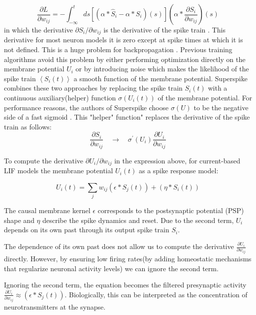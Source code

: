 \documentclass[12pt]{report}
\begin{document}
\begin{equation}
\frac{\partial L}{\partial w_{i j}}=-\int_{-\infty}^{t} d s\left[\left(\alpha * \hat{S}_{i}-\alpha * S_{i}\right)(s)\right]\left(\alpha * \frac{\partial S_{i}}{\partial w_{i j}}\right)(s)
\end{equation}
in which the derivative $\partial S_{i} / \partial w_{i j}$ is the derivative of the spike train . This derivative for most neuron models it is zero except at spike times at which it is not defined. This is a huge problem for backpropagation . Previous training algorithms avoid this problem by either performing optimization directly on the membrane potential $U_{i}$ or by introducing noise which makes the likelihood of the spike train $\left\langle S_{i}(t)\right\rangle$ a smooth function of the membrane potential. Superspike combines these two approaches by replacing the spike train $S_{i}(t)$ with a continuous auxiliary(helper) function $\sigma\left(U_{i}(t)\right)$ of the membrane potential. For performance reasons, the authors of Superspike choose $\sigma(U)$ to be the negative side of a fast sigmoid . This "helper" function" replaces the derivative of the spike train as follows:
\begin{equation}
\frac{\partial S_{i}}{\partial w_{i j}} \quad \rightarrow \quad \sigma^{\prime}\left(U_{i}\right) \frac{\partial U_{i}}{\partial w_{i j}}
\end{equation}

To compute the derivative $\partial U_{i} / \partial w_{i j}$ in the expression above, for current-based LIF models the membrane potential $U_{i}(t)$ as a spike response model:

\begin{equation}
U_{i}(t)=\sum_{j} w_{i j}\left(\epsilon * S_{j}(t)\right)+\left(\eta * S_{i}(t)\right)
\end{equation}

The causal membrane kernel $\epsilon$ corresponds to the postsynaptic potential (PSP) shape and $\eta$ describe the spike dynamics and reset. Due to the second term, $U_{i}$ depends on its own past through its output spike train $S_{i}$. 


The dependence of its own past does not allow us to compute the derivative $\frac{{\partial U}_{i}}{\partial w_{i j}}$ directly. However, by ensuring low firing rates(by adding homeostatic mechanisms that regularize neuronal activity levels) we can ignore the second term.

Ignoring the second term, the equation becomes the filtered presynaptic activity $\frac{\partial U_{i}}{\partial w_{i j}} \approx\left(\epsilon * S_{j}(t)\right)$. Biologically, this can be interpreted as the concentration of neurotransmitters at the synapse. 
\end{document}

